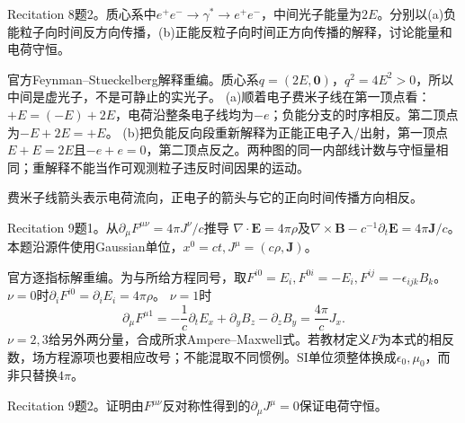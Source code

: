 \begin{exercise}\label{ex:rec-8-2}
Recitation 8题2。质心系中$e^+e^-\to\gamma^*\to e^+e^-$，中间光子能量为$2E$。分别以(a)负能粒子向时间反方向传播，(b)正能反粒子向时间正方向传播的解释，讨论能量和电荷守恒。
\end{exercise}
\begin{solution}
官方Feynman--Stueckelberg解释重编。质心系$q=(2E,\mathbf0)$，$q^2=4E^2>0$，所以中间是虚光子，不是可静止的实光子。
(a)顺着电子费米子线在第一顶点看：$+E=(-E)+2E$，电荷沿整条电子线均为$-e$；负能分支的时序相反。第二顶点为$-E+2E=+E$。
(b)把负能反向段重新解释为正能正电子入/出射，第一顶点$E+E=2E$且$-e+e=0$，第二顶点反之。两种图的同一内部线计数与守恒量相同；重解释不能当作可观测粒子违反时间因果的运动。
\begin{center}\end{center}
费米子线箭头表示电荷流向，正电子的箭头与它的正向时间传播方向相反。
\end{solution}
\begin{exercise}\label{ex:rec-9-1}
Recitation 9题1。从$\partial_\mu F^{\mu\nu}=4\pi J^\nu/c$推导
$\nabla\cdot\mathbf E=4\pi\rho$及$\nabla\times\mathbf B-c^{-1}\partial_t\mathbf E=4\pi\mathbf J/c$。本题沿源件使用Gaussian单位，$x^0=ct,J^\mu=(c\rho,\mathbf J)$。
\end{exercise}
\begin{solution}
官方逐指标解重编。为与所给方程同号，取$F^{i0}=E_i,F^{0i}=-E_i,F^{ij}=-\epsilon_{ijk}B_k$。
$\nu=0$时$\partial_iF^{i0}=\partial_iE_i=4\pi\rho$。
$\nu=1$时
\begin{equation}
 \partial_\mu F^{\mu1}=-\frac1c\partial_tE_x+\partial_yB_z-\partial_zB_y
 =\frac{4\pi}{c}J_x.
\end{equation}
$\nu=2,3$给另外两分量，合成所求Ampere--Maxwell式。若教材定义$F$为本式的相反数，场方程源项也要相应改号；不能混取不同惯例。SI单位须整体换成$\epsilon_0,\mu_0$，而非只替换$4\pi$。
\end{solution}
\begin{exercise}\label{ex:rec-9-2}
Recitation 9题2。证明由$F^{\mu\nu}$反对称性得到的$\partial_\mu J^\mu=0$保证电荷守恒。
\end{exercise}
